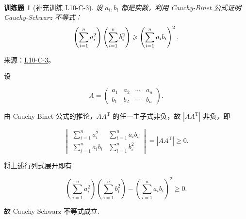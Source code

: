 \documentclass[12pt,fontset=fandol]{ctexart}
\newtheorem{exercise}{训练题}[section]
\begin{document}
\begin{exercise}[补充训练 L10-C-3]\label{prob:L10-C-3}
设 $a_i, b_i$ 都是实数，利用 Cauchy-Binet 公式证明 Cauchy-Schwarz 不等式：
        \[
            \left( \sum_{i=1}^{n}\limits a_i^2 \right) \left( \sum_{i=1}^{n}\limits b_i^2 \right) \geqslant \left( \sum_{i=1}^{n}\limits a_i b_i \right)^2.
        \]
\end{exercise}
\noindent 来源：\href{https://github.com/yhwu-is/Linear-Algebra-Left-Undone/blob/new/%E8%AE%B2%E4%B9%89/%E4%B8%93%E9%A2%98/10%20%E8%A1%8C%E5%88%97%E5%BC%8F.tex}{L10-C-3}。
\begin{solve}
设

            \[
                A = \begin{pmatrix}
                    a_1 & a_2 & \cdots & a_n \\
                    b_1 & b_2 & \cdots & b_n
                \end{pmatrix}.
            \]

            由 Cauchy-Binet 公式的推论，$A A^{\mathrm{T}}$ 的任一主子式非负，故 $|AA^\mathrm{T}|$ 非负，即

            \[
                \begin{vmatrix}
                    \sum\limits_{i=1}^{n} a_i^2 & \sum\limits_{i=1}^{n} a_ib_i \\
                    \sum\limits_{i=1}^{n} a_ib_i & \sum\limits_{i=1}^{n} b_i^2
                \end{vmatrix} = |AA^\mathrm{T}| \geqslant 0.
            \]

            将上述行列式展开即有

            \[
                \left( \sum\limits_{i=1}^{n} a_i^2 \right) \left( \sum\limits_{i=1}^{n} b_i^2 \right) - \left( \sum\limits_{i=1}^{n} a_i b_i \right)^2 \geqslant 0.
            \]

            故 Cauchy-Schwarz 不等式成立.
\end{solve}
\end{document}
